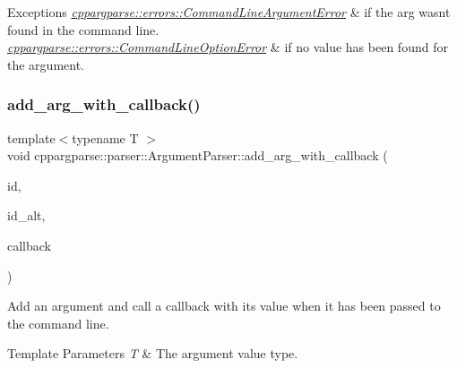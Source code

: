 \begin{DoxyExceptions}{Exceptions}
{\em \hyperlink{classcppargparse_1_1errors_1_1CommandLineArgumentError}{cppargparse\+::errors\+::\+Command\+Line\+Argument\+Error}} & if the arg wasn\textquotesingle{}t found in the command line. \\
\hline
{\em \hyperlink{classcppargparse_1_1errors_1_1CommandLineOptionError}{cppargparse\+::errors\+::\+Command\+Line\+Option\+Error}} & if no value has been found for the argument. \\
\hline
\end{DoxyExceptions}
\mbox{\label{classcppargparse_1_1parser_1_1ArgumentParser_a303a12481a661f3d38c66718d6e593a7}} 
\subsubsection{\texorpdfstring{add\+\_\+arg\+\_\+with\+\_\+callback()}{add\_arg\_with\_callback()}\hspace{0.1cm}{\footnotesize\ttfamily [2/3]}}
{\footnotesize\ttfamily template$<$typename T $>$ \\
void cppargparse\+::parser\+::\+Argument\+Parser\+::add\+\_\+arg\+\_\+with\+\_\+callback (\begin{DoxyParamCaption}\item[{const std\+::string \&}]{id,  }\item[{const std\+::string \&}]{id\+\_\+alt,  }\item[{const std\+::function$<$ void(const \hyperlink{classcppargparse_1_1parser_1_1ArgumentParser}{Argument\+Parser} \&, const T \&)$>$ \&}]{callback }\end{DoxyParamCaption})\hspace{0.3cm}{\ttfamily [inline]}}



Add an argument and call a callback with its value when it has been passed to the command line. 


\begin{DoxyTemplParams}{Template Parameters}
{\em T} & The argument value type.\\
\hline
\end{DoxyTemplParams}

